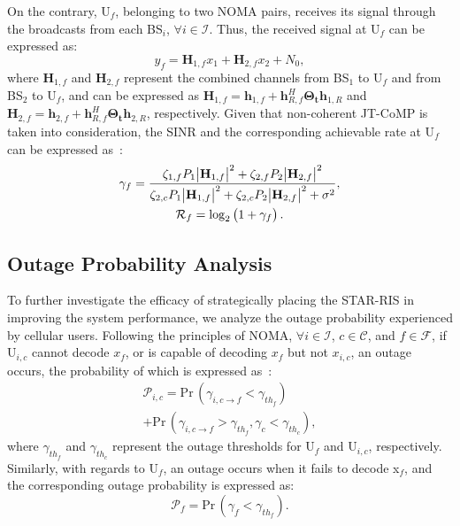 \documentclass[conference]{IEEEtran}
\begin{document}
On the contrary, U$_f$, belonging to two NOMA pairs, receives its signal through the broadcasts from each BS$_i$, $\forall i \in \mathcal{I}$. Thus, the received signal at U$_f$ can be expressed as:
\begin{equation}
    y_f = \textbf{H}_{1, f}x_1 + \textbf{H}_{2, f}x_2 + N_0,
\end{equation}
where $\textbf{H}_{1, f}$ and $\textbf{H}_{2, f}$ represent the combined channels from BS$_1$ to U$_f$ and from BS$_2$ to U$_f$, and can be expressed as $\textbf{H}_{1, f}=\textbf{h}_{1, f}+\textbf{h}_{R, f}^H \mathbf{\Theta_t}\textbf{h}_{1, R}$ and $\textbf{H}_{2, f}=\textbf{h}_{2, f}+\textbf{h}_{R, f}^H \mathbf{\Theta_t}\textbf{h}_{2, R}$, respectively. Given that non-coherent JT-CoMP is taken into consideration, the SINR and the corresponding achievable rate at U$_f$ can be expressed as~\cite{tanbourgi2014tractable, elhattab2022ris}:
\begin{gather}
    \gamma_{f}=\frac{\zeta_{1,f}P_1\abs{\textbf{H}_{1, f}}^2 + \zeta_{2,f}P_2\abs{\textbf{H}_{2, f}}^2}{\zeta_{2,c}P_1\abs{\textbf{H}_{1, f}}^2 + \zeta_{2,c}P_2\abs{\textbf{H}_{2, f}}^2 + \sigma^2}, \\
    \mathcal{R}_{f}=\log_2\left(1 + \gamma_f\right).
\end{gather}


\subsection{Outage Probability Analysis}
To further investigate the efficacy of strategically placing the STAR-RIS in improving the system performance, we analyze the outage probability experienced by cellular users. Following the principles of NOMA, $\forall i \in \mathcal{I}$, $c \in \mathcal{C}$, and $f \in \mathcal{F}$, if U$_{i,c}$ cannot decode $x_f$, or is capable of decoding $x_f$ but not $x_{i,c}$, an outage occurs, the probability of which is expressed as~\cite{9856598}:
\begin{multline}
    \mathcal{P}_{i,c} = \text{Pr}\,(\gamma_{i,c \rightarrow f} < \gamma_{th_f}) \\ + \text{Pr}\,(\gamma_{i,c \rightarrow f} > \gamma_{th_f}, \gamma_{c} < \gamma_{th_{c}}),
\end{multline}
where $\gamma_{th_f}$ and $\gamma_{th_{c}}$ represent the outage thresholds for U$_f$ and U$_{i,c}$, respectively. Similarly, with regards to U$_f$, an outage occurs when it fails to decode x$_f$, and the corresponding outage probability is expressed as:
\begin{equation}
    \mathcal{P}_{f}=\text{Pr}\,(\gamma_{f}<\gamma_{th_f}).
\end{equation}
\end{document}
